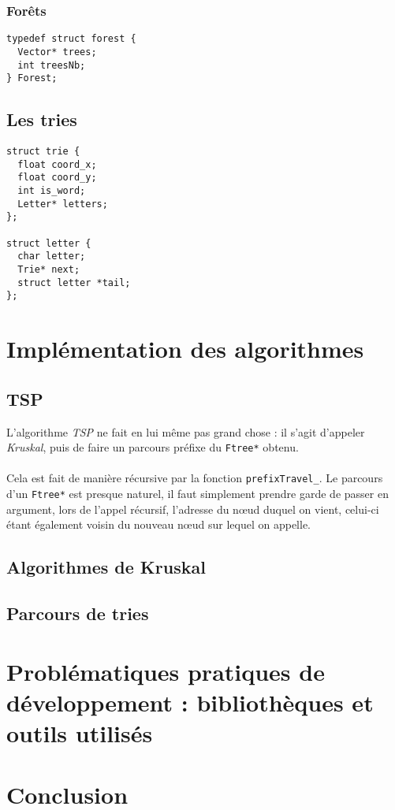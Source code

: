 \documentclass[a4paper]{article}
\begin{document}
\subsubsection{Forêts}

\begin{verbatim}
typedef struct forest {
  Vector* trees;
  int treesNb;
} Forest;
\end{verbatim}

\subsection{Les tries}

\begin{verbatim}
struct trie {
  float coord_x;
  float coord_y;
  int is_word;
  Letter* letters;
};

struct letter {
  char letter;
  Trie* next;
  struct letter *tail;
};
\end{verbatim}

\section{Implémentation des algorithmes}

\subsection{TSP}
L'algorithme \emph{TSP} ne fait en lui même pas grand chose : il s'agit d'appeler \emph{Kruskal}, puis de faire un parcours préfixe du \texttt{Ftree*} obtenu.

\paragraph*{}
Cela est fait de manière récursive par la fonction \texttt{prefixTravel_}. Le parcours d'un \texttt{Ftree*} est presque naturel, il faut simplement prendre garde de passer en argument, lors de l'appel récursif, l'adresse du nœud duquel on vient, celui-ci étant également voisin du nouveau nœud sur lequel on appelle.
\subsection{Algorithmes de Kruskal}

\subsection{Parcours de tries}

\section{Problématiques pratiques de développement : bibliothèques et outils utilisés}


\section*{Conclusion}
\end{document}
